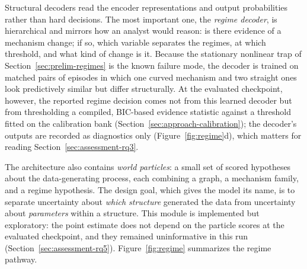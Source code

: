 \documentclass[electronics,article,submit,oneauthor]{Definitions/mdpi}
\begin{document}
Structural decoders read the encoder representations and output probabilities rather than hard decisions. The most important one, the \emph{regime decoder}, is hierarchical and mirrors how an analyst would reason: is there evidence of a mechanism change; if so, which variable separates the regimes, at which threshold, and what kind of change is it. Because the stationary nonlinear trap of Section~\ref{sec:prelim-regimes} is the known failure mode, the decoder is trained on matched pairs of episodes in which one curved mechanism and two straight ones look predictively similar but differ structurally. At the evaluated checkpoint, however, the reported regime decision comes not from this learned decoder but from thresholding a compiled, BIC-based evidence statistic against a threshold fitted on the calibration bank (Section~\ref{sec:approach-calibration}); the decoder's outputs are recorded as diagnostics only (Figure~\ref{fig:regime}d), which matters for reading Section~\ref{sec:assessment-rq3}.

The architecture also contains \emph{world particles}: a small set of scored hypotheses about the data-generating process, each combining a graph, a mechanism family, and a regime hypothesis. The design goal, which gives the model its name, is to separate uncertainty about \emph{which structure} generated the data from uncertainty about \emph{parameters} within a structure. This module is implemented but exploratory: the point estimate does not depend on the particle scores at the evaluated checkpoint, and they remained uninformative in this run (Section~\ref{sec:assessment-rq5}). Figure~\ref{fig:regime} summarizes the regime pathway.
\end{document}
